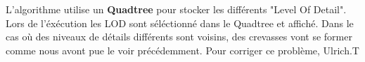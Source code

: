 \documentclass[12pt]{report}
\begin{document}
  L'algorithme utilise un \textbf{Quadtree} pour stocker les différents "Level Of Detail". Lors de l'éxécution les LOD
  sont séléctionné dans le Quadtree et affiché. Dans le cas où des niveaux de détails différents sont voisins, des crevasses
  vont se former comme nous avont pue le voir précédemment. Pour corriger ce problème, Ulrich.T 


  

  

  

  
  
  
  
  
\end{document}
